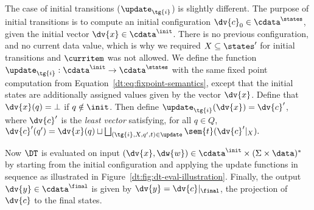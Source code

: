 The case of initial transitions ($\update_\tg{i}$) is slightly different. The purpose of initial transitions is to compute an initial configuration $\dv{c}_0 \in \cdata^{\states}$, given the initial vector $\dv{x} \in \cdata^\init$. There is no previous configuration, and no current data value, which is why we required $X \subseteq \states'$ for initial transitions and $\curritem$ was not allowed.
We define the function $\update_\tg{i}: \cdata^\init \to \cdata^\states$ with the same fixed point computation from Equation~\eqref{dt:eq:fixpoint-semantics}, except that the initial states are additionally assigned values given by the vector $\dv{x}$. Define that $\dv{x}(q) = \bot$ if $q \notin \init$. Then define $\update_\tg{i}(\dv{x}) = \dv{c}'$, where $\dv{c}'$ is the \emph{least vector} satisfying, for all $q \in Q$,
$\dv{c}'(q') = \dv{x}(q) \sqcup \bigsqcup_{(\tg{i}, X, q', t) \in \update} \sem{t}(\dv{c}'|_X).$

Now $\DT$ is evaluated on input
$(\dv{x}, \dw{w}) \in \cdata^\init \times (\Sigma \times \data)^*$
by starting from the initial configuration and applying the update functions in sequence as illustrated in
Figure~\ref{dt:fig:dt-eval-illustration}.
Finally, the output $\dv{y} \in \cdata^\final$ is given by $\dv{y} = \dv{c}|_{\final}$, the projection of $\dv{c}$ to the final states.

